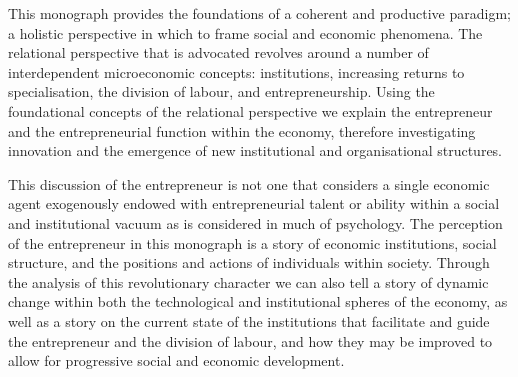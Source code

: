 
\medskip \noindent This monograph provides the foundations of a coherent and productive paradigm; a holistic perspective in which to frame social and economic phenomena. The relational perspective that is advocated revolves around a number of interdependent microeconomic concepts: institutions, increasing returns to specialisation, the division of labour, and entrepreneurship. Using the foundational concepts of the relational perspective we explain the entrepreneur and the entrepreneurial function within the economy, therefore investigating innovation and the emergence of new institutional and organisational structures.

This discussion of the entrepreneur is not one that considers a single economic agent exogenously endowed with entrepreneurial talent or ability within a social and institutional vacuum as is considered in much of psychology. The perception of the entrepreneur in this monograph is a story of economic institutions, social structure, and the positions and actions of individuals within society. Through the analysis of this revolutionary character we can also tell a story of dynamic change within both the technological and institutional spheres of the economy, as well as a story on the current state of the institutions that facilitate and guide the entrepreneur and the division of labour, and how they may be improved to allow for progressive social and economic development.

